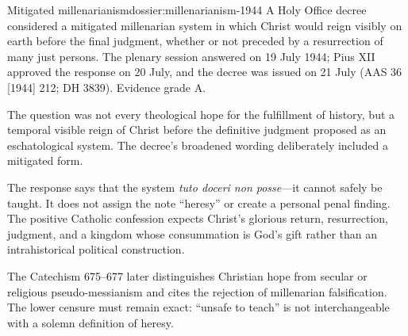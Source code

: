 \begin{heresydossier}{Mitigated millenarianism}{dossier:millenarianism-1944}
\objectfield A Holy Office decree considered a mitigated millenarian system in which Christ would reign visibly on earth before the final judgment, whether or not preceded by a resurrection of many just persons. The plenary session answered on 19 July 1944; Pius XII approved the response on 20 July, and the decree was issued on 21 July (AAS 36 [1944] 212; DH 3839). Evidence grade A.

\propositionfield The question was not every theological hope for the fulfillment of history, but a temporal visible reign of Christ before the definitive judgment proposed as an eschatological system. The decree's broadened wording deliberately included a mitigated form.

\responsefield The response says that the system \emph{tuto doceri non posse}---it cannot safely be taught. It does not assign the note ``heresy'' or create a personal penal finding. The positive Catholic confession expects Christ's glorious return, resurrection, judgment, and a kingdom whose consummation is God's gift rather than an intrahistorical political construction.

\aftermathfield The Catechism 675--677 later distinguishes Christian hope from secular or religious pseudo-messianism and cites the rejection of millenarian falsification. The lower censure must remain exact: ``unsafe to teach'' is not interchangeable with a solemn definition of heresy.
\end{heresydossier}

